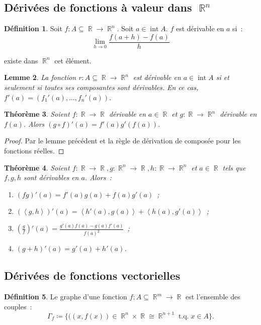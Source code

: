 \documentclass{article}
\DeclareMathOperator{\intr}{int}
\DeclareMathOperator{\R}{\mathbb R}
\DeclareMathOperator{\tq}{ t.q. }
\newcommand{\scpr}[2]{{\left\langle#1, #2\right\rangle}}
\newcommand{\frrn}[2]{#1 : #2 \subseteq \R \to \R^n}
\newcommand{\frmr}[2]{#1 : #2 \subseteq \R^m \to \R}
\newtheorem{thm}{Théorème}[section]
\newtheorem{lem}[thm]{Lemme}
\theoremstyle{definition}
\newtheorem{déf}[thm]{Définition}
\theoremstyle{remark}
\begin{document}
	\subsection{Dérivées de fonctions à valeur dans $\R^n$}
		
		\begin{déf} Soit $\frrn fA$. Soit $a \in \intr A$. $f$ est dérivable en $a$ si~:
		\[\lim_{h \to 0}\frac {f(a+h)-f(a)}h\]

		existe dans $\R^n$ cet élément. \end{déf}

		\begin{lem} La fonction $\frrn rA$ est dérivable en $a \in \intr A$ si et seulement si toutes ses composantes sont dérivables. En ce cas,
		$f'(a) = (f_1'(a), \ldots, f_n'(a))$. \end{lem}

		\begin{thm} Soient $f : \R \to \R$ dérivable en $a \in \R$ et $g : \R \to \R^n$ dérivable en $f(a)$. Alors $(g \circ f)'(a) = f'(a)g'(f(a))$. \end{thm}

		\begin{proof} Par le lemme précédent et la règle de dérivation de composée pour les fonctions réelles. \end{proof}

		\begin{thm} Soient $f : \R \to \R, g : \R^n \to \R, h : \R \to \R^n$ et $a \in \R$ tels que $f, g, h$ sont dérivables en $a$. Alors~:

		\begin{enumerate}
			\item $(fg)'(a) = f'(a)g(a) + f(a)g'(a)$~;
			\item $(\scpr gh)'(a) = \scpr {h'(a)}{g(a)} + \scpr {h(a)}{g'(a)}$~;
			\item $\left(\frac gf\right)'(a) = \frac {g'(a)f(a) - g(a)f'(a)}{f(a)^2}$~;
			\item $(g+h)'(a) = g'(a) + h'(a)$.
		\end{enumerate}
		\end{thm}
	
	\subsection{Dérivées de fonctions vectorielles}
		
		\begin{déf} Le graphe d'une fonction $\frmr fA$ est l'ensemble des couples~:
		\[\Gamma_f \coloneqq \{((x, f(x)) \in \R^n \times \R \cong \R^{n+1} \tq x \in A\}.\]
		\end{déf}
\end{document}
